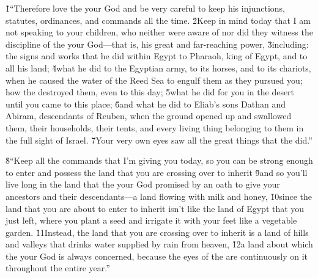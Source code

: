\v{1}``Therefore love the  your God and be very careful to keep his injunctions, statutes, ordinances, and commands all the time. \v{2}Keep in mind today that I am not speaking to your children, who neither were aware of nor did they witness the discipline of the  your God---that is, his great and far-reaching power, \v{3}including: the signs and works that he did within Egypt to Pharaoh, king of Egypt, and to all his land; \v{4}what he did to the Egyptian army, to its horses, and to its chariots, when he caused the water of the Reed Sea to engulf them as they pursued you; how the  destroyed them, even to this day; \v{5}what he did for you in the desert until you came to this place; \v{6}and what he did to Eliab's sons Dathan and Abiram, descendants of Reuben, when the ground opened up and swallowed them, their households, their tents, and every living thing belonging to them in the full sight of Israel. \v{7}Your very own eyes saw all the great things that the  did.''

\v{8}``Keep all the commands that I'm giving you today, so you can be strong enough to enter and possess the land that you are crossing over to inherit \v{9}and so you'll live long in the land that the  your God promised by an oath to give your ancestors and their descendants---a land flowing with milk and honey, \v{10}since the land that you are about to enter to inherit isn't like the land of Egypt that you just left, where you plant a seed and irrigate it with your feet like a vegetable garden. \v{11}Instead, the land that you are crossing over to inherit is a land of hills and valleys that drinks water supplied by rain from heaven, \v{12}a land about which the  your God is always concerned, because the eyes of the  are continuously on it throughout the entire year.''

